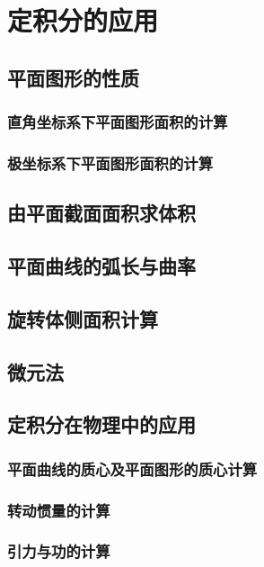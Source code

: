 

\chapter{定积分的应用}\label{ch:8}
\section{平面图形的性质}
\subsection{直角坐标系下平面图形面积的计算}
\subsection{极坐标系下平面图形面积的计算}
\begin{exercise}
\item
\end{exercise}
\section{由平面截面面积求体积}
\begin{exercise}
\item
\end{exercise}
\section{平面曲线的弧长与曲率}
\begin{exercise}
\item
\end{exercise}
\section{旋转体侧面积计算}
\begin{exercise}
\item
\end{exercise}
\section{微元法}
\section{定积分在物理中的应用}
\subsection{平面曲线的质心及平面图形的质心计算}
\subsection{转动惯量的计算}
\subsection{引力与功的计算}
\begin{exercise}
\item
\end{exercise}
\begin{exercise*}
\item
\end{exercise*}




\endinput
